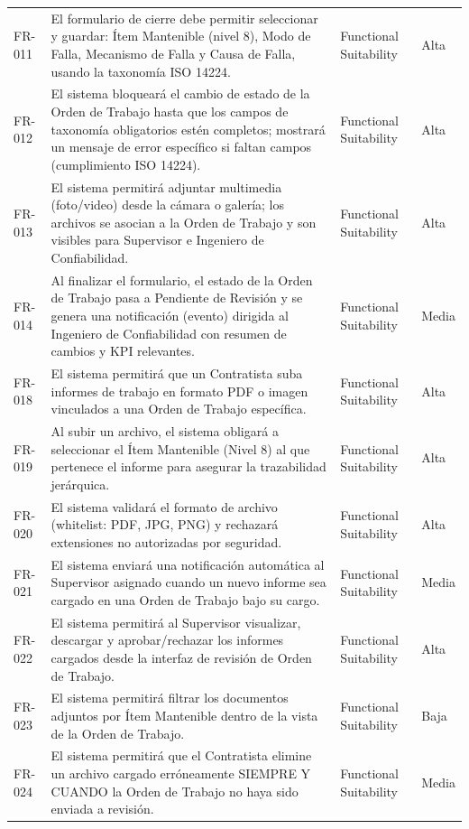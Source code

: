 \begin{longtable}{>{\raggedright\arraybackslash}p{} >{\raggedright\arraybackslash}p{} >{\raggedright\arraybackslash}p{} >{\raggedright\arraybackslash}p{}}
FR-011 & El formulario de cierre debe permitir seleccionar y guardar: Ítem Mantenible (nivel 8), Modo de Falla, Mecanismo de Falla y Causa de Falla, usando la taxonomía ISO 14224. & Functional Suitability & Alta \\
FR-012 & El sistema bloqueará el cambio de estado de la Orden de Trabajo hasta que los campos de taxonomía obligatorios estén completos; mostrará un mensaje de error específico si faltan campos (cumplimiento ISO 14224). & Functional Suitability & Alta \\
FR-013 & El sistema permitirá adjuntar multimedia (foto/video) desde la cámara o galería; los archivos se asocian a la Orden de Trabajo y son visibles para Supervisor e Ingeniero de Confiabilidad. & Functional Suitability & Alta \\
FR-014 & Al finalizar el formulario, el estado de la Orden de Trabajo pasa a Pendiente de Revisión y se genera una notificación (evento) dirigida al Ingeniero de Confiabilidad con resumen de cambios y KPI relevantes. & Functional Suitability & Media \\
FR-018 & El sistema permitirá que un Contratista suba informes de trabajo en formato PDF o imagen vinculados a una Orden de Trabajo específica. & Functional Suitability & Alta \\
FR-019 & Al subir un archivo, el sistema obligará a seleccionar el Ítem Mantenible (Nivel 8) al que pertenece el informe para asegurar la trazabilidad jerárquica. & Functional Suitability & Alta \\
FR-020 & El sistema validará el formato de archivo (whitelist: PDF, JPG, PNG) y rechazará extensiones no autorizadas por seguridad. & Functional Suitability & Alta \\
FR-021 & El sistema enviará una notificación automática al Supervisor asignado cuando un nuevo informe sea cargado en una Orden de Trabajo bajo su cargo. & Functional Suitability & Media \\
FR-022 & El sistema permitirá al Supervisor visualizar, descargar y aprobar/rechazar los informes cargados desde la interfaz de revisión de Orden de Trabajo. & Functional Suitability & Alta \\
FR-023 & El sistema permitirá filtrar los documentos adjuntos por Ítem Mantenible dentro de la vista de la Orden de Trabajo. & Functional Suitability & Baja \\
FR-024 & El sistema permitirá que el Contratista elimine un archivo cargado erróneamente SIEMPRE Y CUANDO la Orden de Trabajo no haya sido enviada a revisión. & Functional Suitability & Media \\

\end{longtable}
